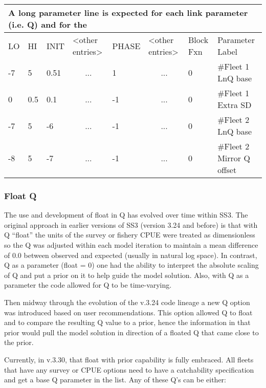 \begin{longtable}{p{1cm} p{1cm} p{1cm} p{1.5cm} p{1.5cm} p{1.5cm} p{1.75cm} p{4cm}}
	\multicolumn{8}{l}{A long parameter line is expected for each link parameter (i.e. Q) and for the} \\
	\hline
	LO \Tstrut & HI & INIT & <other entries> & PHASE & <other entries> & Block Fxn & Parameter Label \Bstrut\\
	\hline
	\endfirsthead
	
	\hline
	\endfoot
	\endlastfoot
	
	-7 & 5   & 0.51 & \multicolumn{1}{c}{...} & 1  & \multicolumn{1}{c}{...} & 0 & \#Fleet 1 LnQ base\Tstrut\\
	0  & 0.5 & 0.1  & \multicolumn{1}{c}{...} & -1 & \multicolumn{1}{c}{...} & 0 & \#Fleet 1 Extra SD\Tstrut\\
	-7 & 5   & -6   & \multicolumn{1}{c}{...} & -1 & \multicolumn{1}{c}{...} & 0 & \#Fleet 2 LnQ base\Bstrut\\
	-8 & 5   & -7   & \multicolumn{1}{c}{...} & -1 & \multicolumn{1}{c}{...} & 0 & \#Fleet 2 Mirror Q offset\Bstrut\\
	\hline
\end{longtable}

\hypertarget{FloatQ}{}
\subsubsection{Float Q}
The use and development of float in Q has evolved over time within SS3. The original approach in earlier versions of SS3 (version 3.24 and before) is that with Q ``float'' the units of the survey or fishery CPUE were treated as dimensionless so the Q was adjusted within each model iteration to maintain a mean difference of 0.0 between observed and expected (usually in natural log space). In contrast, Q as a parameter (float = 0) one had the ability to interpret the absolute scaling of Q and put a prior on it to help guide the model solution. Also, with Q as a parameter the code allowed for Q to be time-varying.

Then midway through the evolution of the v.3.24 code lineage a new Q option was introduced based on user recommendations. This option allowed Q to float and to compare the resulting Q value to a prior, hence the information in that prior would pull the model solution in direction of a floated Q that came close to the prior.

Currently, in v.3.30, that float with prior capability is fully embraced. All fleets that have any survey or CPUE options need to have a catchability specification and get a base Q parameter in the list. Any of these Q's can be either:

